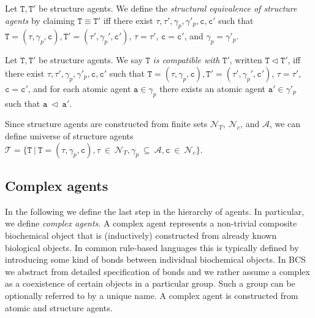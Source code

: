 \documentclass{entcs}
\renewcommand{\~}[0]{\texttildelow}
\begin{document}
\begin{defn}
Let $\mathtt{T},\mathtt{T}'$ be structure agents. We define the \emph{structural equivalence of structure agents} by claiming $\mathtt{T}\equiv\mathtt{T}'$ iff there exist $\tau,\tau',\gamma_p,\gamma'_p,\mathtt{c},\mathtt{c}'$ such that $\mathtt{T}=(\tau, \gamma_p, \mathtt{c}),\mathtt{T}'=(\tau', \gamma_p', \mathtt{c}')$, $\tau=\tau'$, $\mathtt{c} = \mathtt{c}'$, and $\gamma_p=\gamma'_p$.
\end{defn}

\begin{defn}
Let $\mathtt{T},\mathtt{T}'$ be structure agents. We say $\mathtt{T}$ \emph{is compatible with} $\mathtt{T}'$, written $\mathtt{T} \lhd \mathtt{T}'$, iff there exist $\tau,\tau',\gamma_p,\gamma'_p,\mathtt{c},\mathtt{c}'$ such that $\mathtt{T}=(\tau, \gamma_p, \mathtt{c}),\mathtt{T}'=(\tau', \gamma_p', \mathtt{c}')$, $\tau = \tau'$, $\mathtt{c} = \mathtt{c}'$, and for each atomic agent $\mathtt{a} \in \gamma_p$ there exists an atomic agent $\mathtt{a}' \in \gamma'_p$ such that $\mathtt{a}~\lhd~\mathtt{a}'$. 
\end{defn}

\begin{theorem}
Since structure agents are constructed from finite sets $\mathcal{N}_{T},~\mathcal{N}_{c}$, and $\mathcal{A}$, we can define universe of structure agents $\mathcal{T} = \{ \mathtt{T}~|~\mathtt{T} = (\tau, \gamma_p, \mathtt{c}), \tau~\in~\mathcal{N}_{T}, \gamma_p~\subseteq~\mathcal{A},  \mathtt{c}~\in~\mathcal{N}_{c} \}$.
\end{theorem}

\subsection{Complex agents}

In the following we define the last step in the hierarchy of agents. In particular, we define \textit{complex agents}. A complex agent represents a non-trivial composite biochemical object that is (inductively) constructed from already known biological objects. In common rule-based languages this is typically defined by introducing some kind of bonds between individual biochemical objects. In BCS we abstract from detailed specification of bonds and we rather assume a complex as a coexistence of certain objects in a particular group. Such a group can be optionally referred to by a unique name. A complex agent is constructed from atomic and structure agents.
\end{document}
